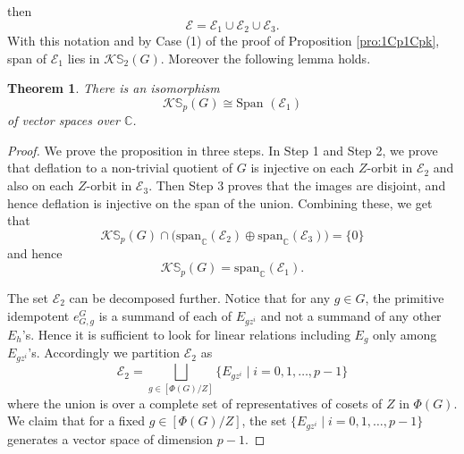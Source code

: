 \documentclass[12pt]{article}
\theoremstyle{plain}
\newtheorem{theorem}{Theorem}[section]
\theoremstyle{definition}
\newcommand{\kerlin}{\mathbb S_p}
\newcommand{\kerlint}{\mathbb S_2}
\begin{document}
\noindent then
\[
\mathcal E =  \mathcal E_1 \cup\mathcal E_2  \cup \mathcal E_3.
\]
With this notation and by Case (1) of the proof of Proposition \ref{pro:1Cp1Cpk}, span of $\mathcal E_1$ lies in $\mathcal K\kerlint(G)$. Moreover the following lemma holds.
\begin{theorem}
    There is an isomorphism 
    \[
    \mathcal K\kerlin(G) \cong \text{Span }(\mathcal E_1)
    \] of vector spaces over $\mathbb C$.
\end{theorem}
\begin{proof} We prove the proposition in three steps. In Step 1 and Step 2, we prove that deflation to a non-trivial quotient of $G$ is injective on each $Z$-orbit in $\mathcal E_2$ and also on each $Z$-orbit in $\mathcal E_3$. Then Step 3 proves that the images are disjoint, and hence deflation is injective on the span of the union. Combining these, we get that 
\[
\mathcal K\kerlin(G)\cap \big(\text{span}_\mathbb C(\mathcal{E}_2)\oplus \text{span}_\mathbb C(\mathcal{E}_3)\big) = \{0\} 
\]
and hence 
\[
\mathcal K\kerlin(G) = \text{span}_\mathbb C(\mathcal{E}_1). 
\]

The set $\mathcal E_2$ can be decomposed further. Notice that for any $g\in G$, the primitive idempotent $e_{G, g}^G$ is a summand of each of $E_{gz^i}$ and not a summand of any other $E_h$'s. Hence it is sufficient to look for linear relations including $E_g$ only among $E_{gz^i}$'s. Accordingly we partition $\mathcal E_2$ as
\[
\mathcal E_2 = \bigsqcup_{g\in [\Phi(G)/Z]}\Big\{ E_{gz^i}\mid i=0, 1, \ldots, p-1 \Big\}
\]
where the union is over a complete set of representatives of cosets of $Z$ in $\Phi(G)$. We claim that for a fixed $g\in [\Phi(G)/Z]$, the set 
$\Big\{ E_{gz^i}\mid i=0, 1, \ldots, p-1 \Big\}$ generates a vector space of dimension $p-1$. 


\end{proof}
\end{document}

